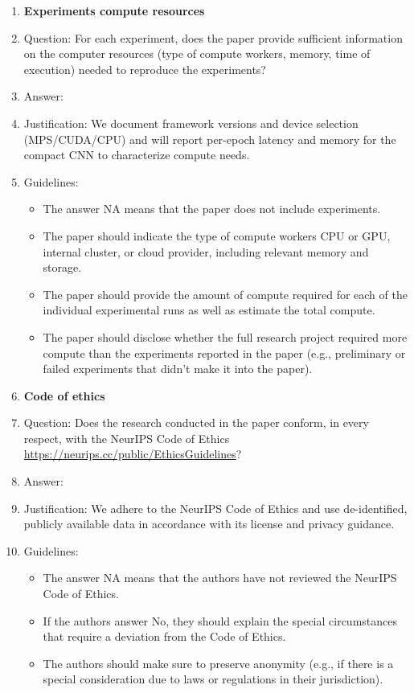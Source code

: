 \documentclass{article}
\begin{document}
\begin{enumerate}
\item {\bf Experiments compute resources}
    \item[] Question: For each experiment, does the paper provide sufficient information on the computer resources (type of compute workers, memory, time of execution) needed to reproduce the experiments?
    \item[] Answer: \answerYes{}
    \item[] Justification: We document framework versions and device selection (MPS/CUDA/CPU) and will report per-epoch latency and memory for the compact CNN to characterize compute needs.
    \item[] Guidelines:
    \begin{itemize}
        \item The answer NA means that the paper does not include experiments.
        \item The paper should indicate the type of compute workers CPU or GPU, internal cluster, or cloud provider, including relevant memory and storage.
        \item The paper should provide the amount of compute required for each of the individual experimental runs as well as estimate the total compute. 
        \item The paper should disclose whether the full research project required more compute than the experiments reported in the paper (e.g., preliminary or failed experiments that didn't make it into the paper). 
    \end{itemize}
    
\item {\bf Code of ethics}
    \item[] Question: Does the research conducted in the paper conform, in every respect, with the NeurIPS Code of Ethics \url{https://neurips.cc/public/EthicsGuidelines}?
    \item[] Answer: \answerYes{}
    \item[] Justification: We adhere to the NeurIPS Code of Ethics and use de-identified, publicly available data in accordance with its license and privacy guidance.
    \item[] Guidelines:
    \begin{itemize}
        \item The answer NA means that the authors have not reviewed the NeurIPS Code of Ethics.
        \item If the authors answer No, they should explain the special circumstances that require a deviation from the Code of Ethics.
        \item The authors should make sure to preserve anonymity (e.g., if there is a special consideration due to laws or regulations in their jurisdiction).
    \end{itemize}



\end{enumerate}
\end{document}
